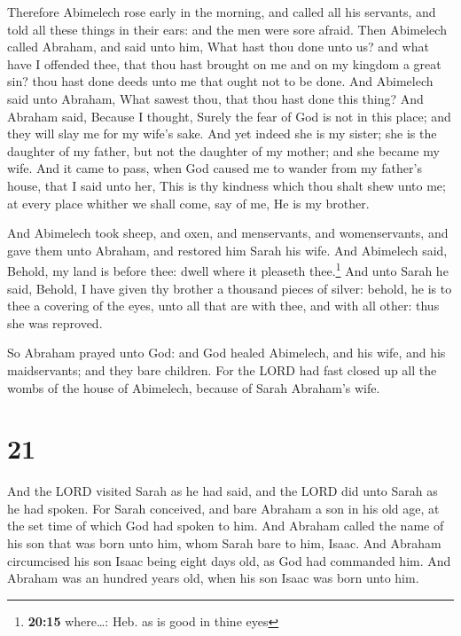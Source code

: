  Therefore Abimelech rose early in the morning, and called
all his servants, and told all these things in their ears: and the men
were sore afraid.  Then Abimelech called Abraham, and said
unto him, What hast thou done unto us? and what have I offended thee,
that thou hast brought on me and on my kingdom a great sin? thou hast
done deeds unto me that ought not to be done.  And
Abimelech said unto Abraham, What sawest thou, that thou hast done this
thing?  And Abraham said, Because I thought, Surely the
fear of God is not in this place; and they will slay me for my wife's
sake.  And yet indeed she is my sister; she is the
daughter of my father, but not the daughter of my mother; and she became
my wife.  And it came to pass, when God caused me to
wander from my father's house, that I said unto her, This is thy
kindness which thou shalt shew unto me; at every place whither we shall
come, say of me, He is my brother.

 And Abimelech took sheep, and oxen, and menservants, and
womenservants, and gave them unto Abraham, and restored him Sarah his
wife.  And Abimelech said, Behold, my land is before
thee: dwell where it pleaseth thee.\footnote{\textbf{20:15} where\ldots:
  Heb. as is good in thine eyes}  And unto Sarah he said,
Behold, I have given thy brother a thousand pieces of silver: behold, he
is to thee a covering of the eyes, unto all that are with thee, and with
all other: thus she was reproved.

 So Abraham prayed unto God: and God healed Abimelech,
and his wife, and his maidservants; and they bare children.
 For the LORD had fast closed up all the wombs of the
house of Abimelech, because of Sarah Abraham's wife.

\hypertarget{section-20}{%
\section{21}\label{section-20}}

 And the LORD visited Sarah as he had said, and the LORD
did unto Sarah as he had spoken.  For Sarah conceived, and
bare Abraham a son in his old age, at the set time of which God had
spoken to him.  And Abraham called the name of his son
that was born unto him, whom Sarah bare to him, Isaac. 
And Abraham circumcised his son Isaac being eight days old, as God had
commanded him.  And Abraham was an hundred years old, when
his son Isaac was born unto him.

